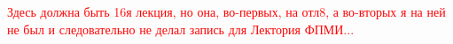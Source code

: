 \textcolor{red}{Здесь должна быть 16я лекция, но она, во-первых, на отл8, а во-вторых я на ней не был и следовательно не делал запись для Лектория ФПМИ...}